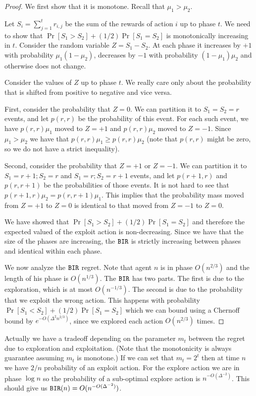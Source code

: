 \begin{proof}
We first show that it is monotone. Recall that $\mu_1>\mu_2$.

Let
$S_i=\sum_{j=1}^t r_{i,j}$ be the sum of the rewards of action $i$
up to phase $t$. We need to show that $\Pr[S_1>S_2]+ (1/2)
\Pr[S_1=S_2]$ is monotonically increasing in $t$. Consider the
random variable $Z=S_1-S_2$. At each phase it increases by $+1$ with
probability $\mu_1(1-\mu_2)$, decreases by $-1$ with probability
$(1-\mu_1)\mu_2$ and otherwise does not change.

Consider the values of $Z$ up to phase $t$. We really care only
about the probability that is shifted from positive to negative and
vice versa.

First, consider the probability that $Z=0$. We can partition it to
$S_1=S_2=r$ events, and let $p(r,r)$ be the probability of this
event. For each such event, we have $p(r,r)\mu_1$ moved to $Z=+1$
and $p(r,r)\mu_2$ moved to $Z=-1$. Since $\mu_1>\mu_2$ we have that
$p(r,r)\mu_1\geq p(r,r)\mu_2$ (note that $p(r,r)$ might be zero, so
we do not have a strict inequality).

Second, consider the probability that $Z=+1$ or $Z=-1$. We can
partition it to $S_1=r+1;S_2=r$ and $S_1=r;S_2=r+1$ events, and let
$p(r+1,r)$ and $p(r,r+1)$ be the probabilities of those events.
%
It is not hard to see that $p(r+1,r)\mu_2=p(r,r+1)\mu_1$.
%
This implies that the probability mass moved from $Z=+1$ to $Z=0$ is
identical to that moved from $Z=-1$ to $Z=0$.

We have showed that $\Pr[S_1>S_2]+ (1/2) \Pr[S_1=S_2]$ and therefore
the expected valued of the exploit action is non-decreasing. Since
we have that the size of the phases are increasing, the $\mathtt{BIR}$ is
strictly increasing between phases and identical within each phase.

We now analyze the $\mathtt{BIR}$ regret. Note that agent $n$ is in phase
$O(n^{2/3})$ and the length of his phase is $O(n^{1/3})$. The $\mathtt{BIR}$
has two parts. The first is due to the exploration, which is at most
$O(n^{-1/3})$. The second is due to the probability that we exploit
the wrong action. This happens with probability $\Pr[S_1<S_2]+ (1/2)
\Pr[S_1=S_2]$ which we can bound using a Chernoff bound by
$e^{-O(\Delta^2n^{2/3})}$, since we explored each action
$O(n^{2/3})$ times.
\end{proof}

\begin{remark}
Actually we have a tradeoff depending on the parameter $m_t$ between
the regret due to exploration and exploitation. (Note that the
monotonicity is always guarantee assuming $m_t$ is monotone.) If we
can set that $m_t = 2^t$ then at time $n$ we have $2/ n$ probability
of an exploit action. For the explore action we are in phase $\log
n$ so the probability of a sub-optimal explore action is
$n^{-O(\Delta^{-2})}$. This should give us
$\mathtt{BIR}(n)=O(n^{-O(\Delta^{-2})})$.
\end{remark}



